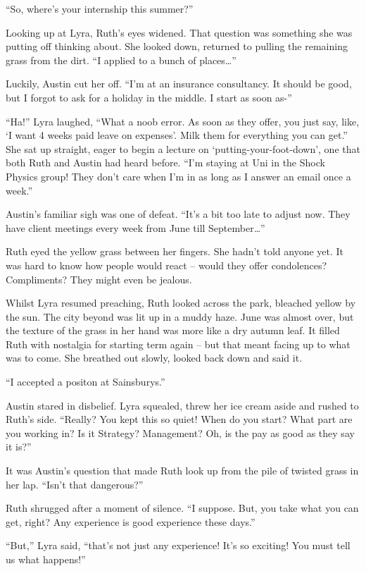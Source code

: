 “So, where’s your internship this summer?”

Looking up at Lyra, Ruth’s eyes widened. That question was something she was putting off thinking about. She looked down, returned to pulling the remaining grass from the dirt. “I applied to a bunch of places…”

Luckily, Austin cut her off. “I’m at an insurance consultancy. It should be good, but I forgot to ask for a holiday in the middle. I start as soon as-''

“Ha!” Lyra laughed, “What a noob error. As soon as they offer, you just say, like, ‘I want 4 weeks paid leave on expenses’. Milk them for everything you can get.” She sat up straight, eager to begin a lecture on ‘putting-your-foot-down’, one that both Ruth and Austin had heard before. “I’m staying at Uni in the Shock Physics group! They don’t care when I’m in as long as I answer an email once a week.”

Austin’s familiar sigh was one of defeat. “It’s a bit too late to adjust now. They have client meetings every week from June till September…”

Ruth eyed the yellow grass between her fingers. She hadn’t told anyone yet. It was hard to know how people would react – would they offer condolences? Compliments? They might even be jealous. 

Whilst Lyra resumed preaching, Ruth looked across the park, bleached yellow by the sun. The city beyond was lit up in a muddy haze. June was almost over, but the texture of the grass in her hand was more like a dry autumn leaf. It filled Ruth with nostalgia for starting term again – but that meant facing up to what was to come. She breathed out slowly, looked back down and said it. 

“I accepted a positon at Sainsburys.”

Austin stared in disbelief. Lyra squealed, threw her ice cream aside and rushed to Ruth’s side. “Really? You kept this so quiet! When do you start? What part are you working in? Is it Strategy? Management? Oh, is the pay as good as they say it is?”

It was Austin’s question that made Ruth look up from the pile of twisted grass in her lap. “Isn’t that dangerous?”

Ruth shrugged after a moment of silence. “I suppose. But, you take what you can get, right? Any experience is good experience these days.”

“But,” Lyra said, “that’s not just any experience! It’s so exciting! You must tell us what happens!”

